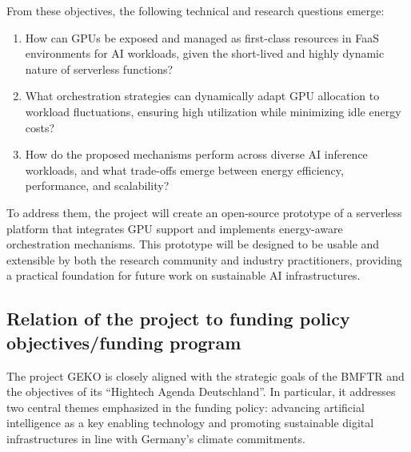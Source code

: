 From these objectives, the following technical and research questions emerge:
\begin{enumerate}
    \item How can GPUs be exposed and managed as first-class resources in FaaS environments for AI workloads, given the short-lived and highly dynamic nature of serverless functions? %
    \item What orchestration strategies can dynamically adapt GPU allocation to workload fluctuations, ensuring high utilization while minimizing idle energy costs? %
    \item How do the proposed mechanisms perform across diverse AI inference workloads, and what trade-offs emerge between energy efficiency, performance, and scalability? %
\end{enumerate}

To address them, the project will create an open-source prototype of a serverless platform that integrates GPU support and implements energy-aware orchestration mechanisms.
This prototype will be designed to be usable and extensible by both the research community and industry practitioners, providing a practical foundation for future work on sustainable AI infrastructures.


\subsection{Relation of the project to funding policy objectives/funding program}


The project GEKO is closely aligned with the strategic goals of the BMFTR and the objectives of its \enquote{Hightech Agenda Deutschland}.
In particular, it addresses two central themes emphasized in the funding policy: advancing artificial intelligence as a key enabling technology and promoting sustainable digital infrastructures in line with Germany's climate commitments.

